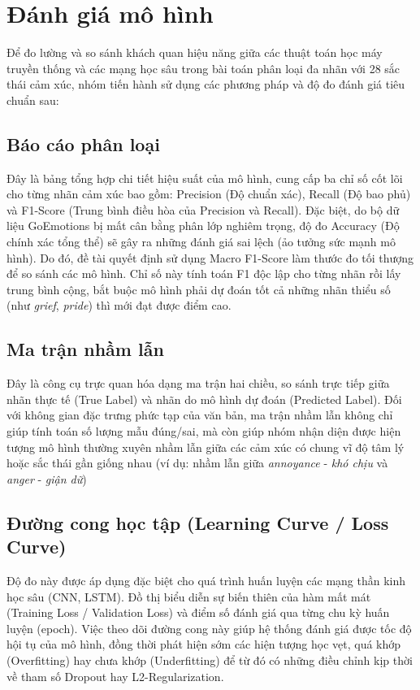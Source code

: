 \section{Đánh giá mô hình}

Để đo lường và so sánh khách quan hiệu năng giữa các thuật toán học máy truyền thống và các mạng học sâu trong bài toán phân loại đa nhãn với 28 sắc thái cảm xúc, nhóm tiến hành sử dụng các phương pháp và độ đo đánh giá tiêu chuẩn sau:

\subsection{Báo cáo phân loại}

Đây là bảng tổng hợp chi tiết hiệu suất của mô hình, cung cấp ba chỉ số cốt lõi cho từng nhãn cảm xúc bao gồm: Precision (Độ chuẩn xác), Recall (Độ bao phủ) và F1-Score (Trung bình điều hòa của Precision và Recall). Đặc biệt, do bộ dữ liệu GoEmotions bị mất cân bằng phân lớp nghiêm trọng, độ đo Accuracy (Độ chính xác tổng thể) sẽ gây ra những đánh giá sai lệch (ảo tưởng sức mạnh mô hình). Do đó, đề tài quyết định sử dụng Macro F1-Score làm thước đo tối thượng để so sánh các mô hình. Chỉ số này tính toán F1 độc lập cho từng nhãn rồi lấy trung bình cộng, bắt buộc mô hình phải dự đoán tốt cả những nhãn thiểu số (như \textit{grief}, \textit{pride}) thì mới đạt được điểm cao.
 
\subsection{Ma trận nhầm lẫn}

Đây là công cụ trực quan hóa dạng ma trận hai chiều, so sánh trực tiếp giữa nhãn thực tế (True Label) và nhãn do mô hình dự đoán (Predicted Label). Đối với không gian đặc trưng phức tạp của văn bản, ma trận nhầm lẫn không chỉ giúp tính toán số lượng mẫu đúng/sai, mà còn giúp nhóm nhận diện được hiện tượng mô hình thường xuyên nhầm lẫn giữa các cảm xúc có chung vĩ độ tâm lý hoặc sắc thái gần giống nhau (ví dụ: nhầm lẫn giữa \textit{annoyance} - \textit{khó chịu} và \textit{anger} - \textit{giận dữ})

\subsection{Đường cong học tập (Learning Curve / Loss Curve)}

Độ đo này được áp dụng đặc biệt cho quá trình huấn luyện các mạng thần kinh học sâu (CNN, LSTM). Đồ thị biểu diễn sự biến thiên của hàm mất mát (Training Loss / Validation Loss) và điểm số đánh giá qua từng chu kỳ huấn luyện (epoch). Việc theo dõi đường cong này giúp hệ thống đánh giá được tốc độ hội tụ của mô hình, đồng thời phát hiện sớm các hiện tượng học vẹt, quá khớp (Overfitting) hay chưa khớp (Underfitting) để từ đó có những điều chỉnh kịp thời về tham số Dropout hay L2-Regularization.